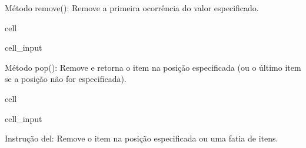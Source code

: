 \documentclass[letterpaper,10pt,english]{jupyterBook}
\begin{document}
\sphinxAtStartPar
Método remove(): Remove a primeira ocorrência do valor especificado.

\begin{sphinxuseclass}{cell}\begin{sphinxVerbatimInput}

\begin{sphinxuseclass}{cell_input}
\begin{sphinxVerbatim}[commandchars=\\\{\}]
  \PYG{p}{[}  \PYG{p}{]}
  
\end{sphinxVerbatim}

\end{sphinxuseclass}\end{sphinxVerbatimInput}

\end{sphinxuseclass}
\sphinxAtStartPar
Método pop(): Remove e retorna o item na posição especificada (ou o último item se a posição não for especificada).

\begin{sphinxuseclass}{cell}\begin{sphinxVerbatimInput}

\begin{sphinxuseclass}{cell_input}
\begin{sphinxVerbatim}[commandchars=\\\{\}]
  \PYG{p}{[}  \PYG{p}{]}
  
  
  \PYG{c+c1}{\PYGZsh{} Saída: [\PYGZsq{}Andes\PYGZsq{}, \PYGZsq{}Al}
\end{sphinxVerbatim}

\end{sphinxuseclass}\end{sphinxVerbatimInput}

\end{sphinxuseclass}
\sphinxAtStartPar
Instrução del: Remove o item na posição especificada ou uma fatia de itens.
\end{document}
